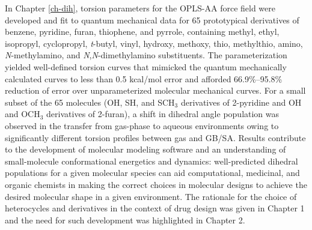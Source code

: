 \documentclass[12pt]{report}
\begin{document}
In Chapter \ref{ch-dih}, torsion parameters for the OPLS-AA force field were developed and fit to quantum mechanical data for 65 prototypical derivatives of benzene, pyridine, furan, thiophene, and pyrrole, containing methyl, ethyl, isopropyl, cyclopropyl, \textit{t}-butyl, vinyl, hydroxy, methoxy, thio, methylthio, amino, \textit{N}-methylamino, and  \textit{N},\textit{N}-dimethylamino substituents. The parameterization yielded well-defined torsion curves that mimicked the quantum mechanically calculated curves to less than 0.5 kcal/mol error and afforded 66.9\%--95.8\% reduction of error over unparameterized molecular mechanical curves. For a small subset of the 65 molecules (OH, SH, and SCH$_3$ derivatives of 2-pyridine and OH and OCH$_3$ derivatives of 2-furan), a shift in dihedral angle population was observed in the transfer from gas-phase to aqueous environments owing to significantly different torsion profiles between gas and GB/SA. Results contribute to the development of molecular modeling software and an understanding of small-molecule conformational energetics and dynamics: well-predicted dihedral populations for a given molecular species can aid computational, medicinal, and organic chemists in making the correct choices in molecular designs to achieve the desired molecular shape in a given environment.  The rationale for the choice of heterocycles and derivatives in the context of drug design was given in Chapter 1 and the need for such development was highlighted in Chapter 2.


\end{document}
